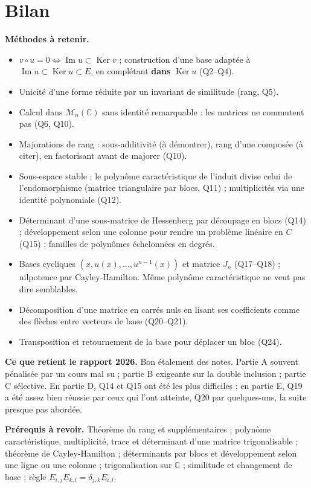 \documentclass[11pt,a4paper]{article}
\providecommand{\tightlist}{\setlength{\itemsep}{0pt}\setlength{\parskip}{0pt}}
\begin{document}
\hypertarget{bilan}{%
\section{Bilan}\label{bilan}}

\textbf{Méthodes à retenir.}

\begin{itemize}
\tightlist
\item
  \(v\circ u=0\iff\operatorname{Im}u\subset\operatorname{Ker}v\) ; construction d'une base adaptée à \(\operatorname{Im}u\subset\operatorname{Ker}u\subset E\), en complétant \textbf{dans} \(\operatorname{Ker}u\) (Q2--Q4).
\item
  Unicité d'une forme réduite par un invariant de similitude (rang, Q5).
\item
  Calcul dans \(\mathcal M_n(\mathbb C)\) sans identité remarquable : les matrices ne commutent pas (Q6, Q10).
\item
  Majorations de rang : sous-additivité (à démontrer), rang d'une composée (à citer), en factorisant avant de majorer (Q10).
\item
  Sous-espace stable : le polynôme caractéristique de l'induit divise celui de l'endomorphisme (matrice triangulaire par blocs, Q11) ; multiplicités via une identité polynomiale (Q12).
\item
  Déterminant d'une sous-matrice de Hessenberg par découpage en blocs (Q14) ; développement selon une colonne pour rendre un problème linéaire en \(C\) (Q15) ; familles de polynômes échelonnées en degrés.
\item
  Bases cycliques \((x,u(x),\dots,u^{n-1}(x))\) et matrice \(J_n\) (Q17--Q18) ; nilpotence par Cayley-Hamilton. Même polynôme caractéristique ne veut pas dire semblables.
\item
  Décomposition d'une matrice en carrés nuls en lisant ses coefficients comme des flèches entre vecteurs de base (Q20--Q21).
\item
  Transposition et retournement de la base pour déplacer un bloc (Q24).
\end{itemize}

\textbf{Ce que retient le rapport 2026.} Bon étalement des notes. Partie A souvent pénalisée par un cours mal su ; partie B exigeante sur la double inclusion ; partie C sélective. En partie D, Q14 et Q15 ont été les plus difficiles ; en partie E, Q19 a été assez bien réussie par ceux qui l'ont atteinte, Q20 par quelques-uns, la suite presque pas abordée.

\textbf{Prérequis à revoir.} Théorème du rang et supplémentaires ; polynôme caractéristique, multiplicité, trace et déterminant d'une matrice trigonalisable ; théorème de Cayley-Hamilton ; déterminants par blocs et développement selon une ligne ou une colonne ; trigonalisation sur \(\mathbb C\) ; similitude et changement de base ; règle \(E_{i,j}E_{k,l}=\delta_{j,k}E_{i,l}\).
\end{document}
